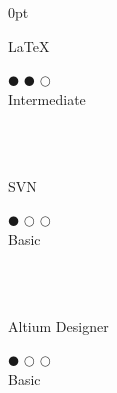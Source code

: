 \documentclass[a4paper]{article}
\begin{document}
\begin{adjustwidth}{\parindent}{0pt}
\begin{minipage}[t]{0.25\textwidth}
\begin{minipage}{0.65\textwidth}
  \small{\LaTeX}
\end{minipage}
\begin{minipage}{0.3\textwidth}
  \centering $\mdlgblkcircle$ $\mdlgblkcircle$ $\mdlgwhtcircle$ \\  \footnotesize{\mbox{Intermediate}}
\end{minipage} \\ \hspace{0pt} \\

 \begin{minipage}{0.65\textwidth}
  \small{SVN}
 \end{minipage}
 \begin{minipage}{0.3\textwidth}
  \centering $\mdlgblkcircle$ $\mdlgwhtcircle$ $\mdlgwhtcircle$ \\  \footnotesize{Basic}
 \end{minipage} \\ \hspace{0pt} \\
 
  \begin{minipage}{0.65\textwidth}
   \small{Altium Designer}
 \end{minipage}
 \begin{minipage}{0.3\textwidth}
   \centering $\mdlgblkcircle$ $\mdlgwhtcircle$ $\mdlgwhtcircle$ \\  \footnotesize{Basic}
 \end{minipage} \\ \hspace{0pt} \\

\end{minipage}
\end{adjustwidth}
\end{document}
